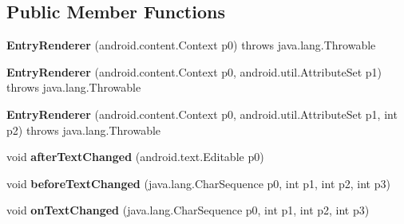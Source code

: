 \subsection*{Public Member Functions}
\begin{DoxyCompactItemize}
\item 
\hypertarget{classmd5282f1122c1313907b9bf274dd2c2f344_1_1EntryRenderer_abdb7891f4ef31ae7688b3ae2b30c0e6b}{}{\bfseries Entry\+Renderer} (android.\+content.\+Context p0)  throws java.\+lang.\+Throwable 	\label{classmd5282f1122c1313907b9bf274dd2c2f344_1_1EntryRenderer_abdb7891f4ef31ae7688b3ae2b30c0e6b}

\item 
\hypertarget{classmd5282f1122c1313907b9bf274dd2c2f344_1_1EntryRenderer_a814290037e7dd34499e7dca92cc7d2de}{}{\bfseries Entry\+Renderer} (android.\+content.\+Context p0, android.\+util.\+Attribute\+Set p1)  throws java.\+lang.\+Throwable 	\label{classmd5282f1122c1313907b9bf274dd2c2f344_1_1EntryRenderer_a814290037e7dd34499e7dca92cc7d2de}

\item 
\hypertarget{classmd5282f1122c1313907b9bf274dd2c2f344_1_1EntryRenderer_ab07cd85a60bb339c9d7c12e3dfd02f30}{}{\bfseries Entry\+Renderer} (android.\+content.\+Context p0, android.\+util.\+Attribute\+Set p1, int p2)  throws java.\+lang.\+Throwable 	\label{classmd5282f1122c1313907b9bf274dd2c2f344_1_1EntryRenderer_ab07cd85a60bb339c9d7c12e3dfd02f30}

\item 
\hypertarget{classmd5282f1122c1313907b9bf274dd2c2f344_1_1EntryRenderer_ad3def77c43d3de85272a52ac26fa3dae}{}void {\bfseries after\+Text\+Changed} (android.\+text.\+Editable p0)\label{classmd5282f1122c1313907b9bf274dd2c2f344_1_1EntryRenderer_ad3def77c43d3de85272a52ac26fa3dae}

\item 
\hypertarget{classmd5282f1122c1313907b9bf274dd2c2f344_1_1EntryRenderer_adcdb1152396819cce29b67e9b81a68c1}{}void {\bfseries before\+Text\+Changed} (java.\+lang.\+Char\+Sequence p0, int p1, int p2, int p3)\label{classmd5282f1122c1313907b9bf274dd2c2f344_1_1EntryRenderer_adcdb1152396819cce29b67e9b81a68c1}

\item 
\hypertarget{classmd5282f1122c1313907b9bf274dd2c2f344_1_1EntryRenderer_a241ce45c33649ecb224a89a958cad7eb}{}void {\bfseries on\+Text\+Changed} (java.\+lang.\+Char\+Sequence p0, int p1, int p2, int p3)\label{classmd5282f1122c1313907b9bf274dd2c2f344_1_1EntryRenderer_a241ce45c33649ecb224a89a958cad7eb}


\end{DoxyCompactItemize}
